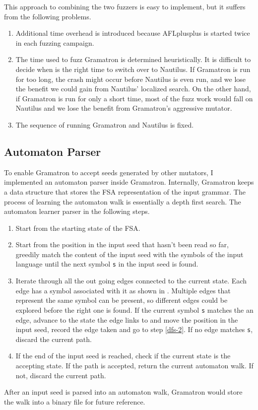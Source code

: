 This approach to combining the two fuzzers is easy to implement, but it suffers from the following problems.
\begin{enumerate}
    \item Additional time overhead is introduced because AFLplusplus is started twice in each fuzzing campaign. 
    \item The time used to fuzz Gramatron is determined heuristically. It is difficult to decide when is the right time to switch over to Nautilus. If Gramatron is run for too long, the crash might occur before Nautilus is even run, and we lose the benefit we could gain from Nautilus' localized search. On the other hand, if Gramatron is run for only a short time, most of the fuzz work would fall on Nautilus and we lose the benefit from Gramatron's aggressive mutator.
    \item The sequence of running Gramatron and Nautilus is fixed. 
\end{enumerate}

\subsection{Automaton Parser}
To enable Gramatron to accept seeds generated by other mutators, I implemented an automaton parser inside Gramatron. Internally, Gramatron keeps a data structure that stores the FSA representation of the input grammar. The process of learning the automaton walk is essentially a depth first search. The automaton learner parser in the following steps.
\begin{enumerate}
    \item Start from the starting state of the FSA.
    \item Start from the position in the input seed that hasn't been read so far, greedily match the content of the input seed with the symbols of the input language until the next symbol \texttt{s} in the input seed is found. \label{dfs-2}
    \item Iterate through all the out going edges connected to the current state. Each edge has a symbol associated with it as shown in . Multiple edges that represent the same symbol can be present, so different edges could be explored before the right one is found. If the current symbol \texttt{s} matches the an edge, advance to the state the edge links to and move the position in the input seed, record the edge taken and go to step \ref{dfs-2}. If no edge matches \texttt{s}, discard the current path. 
    \item If the end of the input seed is reached, check if the current state is the accepting state. If the path is accepted, return the current automaton walk. If not, discard the current path.
\end{enumerate}
After an input seed is parsed into an automaton walk, Gramatron would store the walk into a binary file for future reference.


